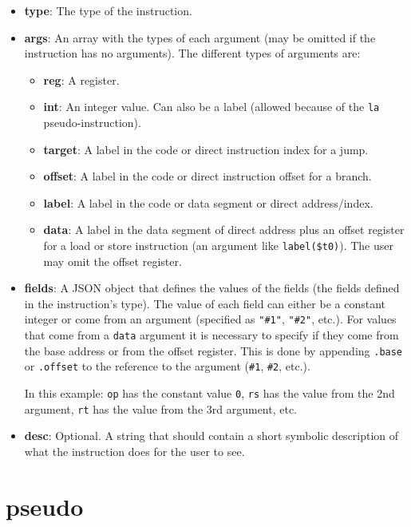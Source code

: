 \documentclass[11pt,a4paper,twoside,titlepage]{report}
\begin{document}
\begin{itemize}
	\item \textbf{type}: The type of the instruction.
	\item \textbf{args}: An array with the types of each argument (may be omitted if
		the instruction has no arguments).
		The different types of arguments are:
		\begin{itemize}
			\item \textbf{reg}: A register.
			\item \textbf{int}: An integer value. Can also be a label (allowed because 
				of the \verb+la+ pseudo-instruction).
			\item \textbf{target}: A label in the code or direct instruction index for 
				a jump.
			\item \textbf{offset}: A label in the code or direct instruction offset 
				for a branch.
			\item \textbf{label}: A label in the code or data segment or direct 
				address/index.
			\item \textbf{data}: A label in the data segment of direct address plus
				an offset register for a load or store instruction (an argument like
				\verb+label($t0)+). The user may omit the offset register.
		\end{itemize}
	\item \textbf{fields}: A JSON object that defines the values of the fields
		(the fields defined in the instruction's type). The value of each field
		can either be a constant integer or come from an argument (specified as
		\verb+"#1"+, \verb+"#2"+, etc.).
		For values that come from a \verb+data+ argument it is necessary to
		specify if they come from the base address or from the offset register.
		This is done by appending \verb+.base+ or \verb+.offset+ to the reference
		to the argument (\verb+#1+, \verb+#2+, etc.).
		
		In this example: \verb+op+ has the constant value \verb+0+, \verb+rs+
		has the value from the 2nd argument, \verb+rt+ has the value from the 3rd
		argument, etc.
	\item \textbf{desc}: Optional. A string that should contain a short symbolic
		description of what the instruction does for the user to see.
\end{itemize}


\section{pseudo}
\end{document}
